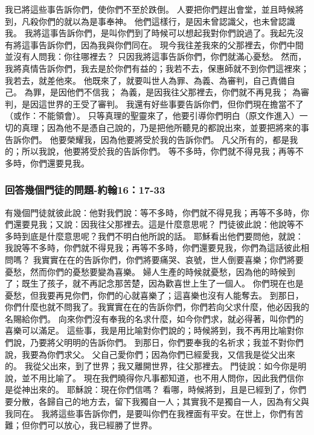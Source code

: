 我已將這些事告訴你們，使你們不至於跌倒。
人要把你們趕出會堂，並且時候將到，凡殺你們的就以為是事奉神。
他們這樣行，是因未曾認識父，也未曾認識我。
我將這事告訴你們，是叫你們到了時候可以想起我對你們說過了。我起先沒有將這事告訴你們，因為我與你們同在。
現今我往差我來的父那裡去，你們中間並沒有人問我：你往哪裡去？
只因我將這事告訴你們，你們就滿心憂愁。
然而，我將真情告訴你們，我去是於你們有益的；我若不去，保惠師就不到你們這裡來；我若去，就差他來。
他既來了，就要叫世人為罪、為義、為審判，自己責備自己。
為罪，是因他們不信我；
為義，是因我往父那裡去，你們就不再見我；
為審判，是因這世界的王受了審判。
我還有好些事要告訴你們，但你們現在擔當不了（或作：不能領會）。
只等真理的聖靈來了，他要引導你們明白（原文作進入）一切的真理；因為他不是憑自己說的，乃是把他所聽見的都說出來，並要把將來的事告訴你們。
他要榮耀我，因為他要將受於我的告訴你們。
凡父所有的，都是我的；所以我說，他要將受於我的告訴你們。
等不多時，你們就不得見我；再等不多時，你們還要見我。
\subsubsection{回答幾個門徒的問題-約翰16：17-33}
有幾個門徒就彼此說：他對我們說：等不多時，你們就不得見我；再等不多時，你們還要見我；又說：因我往父那裡去。這是什麼意思呢？
門徒彼此說：他說等不多時到底是什麼意思呢？我們不明白他所說的話。
耶穌看出他們要問他，就說：我說等不多時，你們就不得見我；再等不多時，你們還要見我，你們為這話彼此相問嗎？
我實實在在的告訴你們，你們將要痛哭、哀號，世人倒要喜樂；你們將要憂愁，然而你們的憂愁要變為喜樂。
婦人生產的時候就憂愁，因為他的時候到了；既生了孩子，就不再記念那苦楚，因為歡喜世上生了一個人。
你們現在也是憂愁，但我要再見你們，你們的心就喜樂了；這喜樂也沒有人能奪去。
到那日，你們什麼也就不問我了。我實實在在的告訴你們，你們若向父求什麼，他必因我的名賜給你們。
向來你們沒有奉我的名求什麼，如今你們求，就必得著，叫你們的喜樂可以滿足。
這些事，我是用比喻對你們說的；時候將到，我不再用比喻對你們說，乃要將父明明的告訴你們。
到那日，你們要奉我的名祈求；我並不對你們說，我要為你們求父。
父自己愛你們；因為你們已經愛我，又信我是從父出來的。
我從父出來，到了世界；我又離開世界，往父那裡去。
門徒說：如今你是明說，並不用比喻了。
現在我們曉得你凡事都知道，也不用人問你，因此我們信你是從神出來的。
耶穌說：現在你們信嗎？
看哪，時候將到，且是已經到了，你們要分散，各歸自己的地方去，留下我獨自一人；其實我不是獨自一人，因為有父與我同在。
我將這些事告訴你們，是要叫你們在我裡面有平安。在世上，你們有苦難；但你們可以放心，我已經勝了世界。






